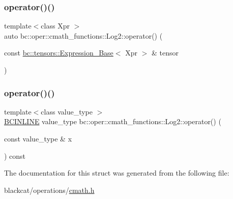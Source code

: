 \mbox{\label{structbc_1_1oper_1_1cmath__functions_1_1Log2_a57496f3baae3c207ec16b69391822119}} 
\subsubsection{\texorpdfstring{operator()()}{operator()()}\hspace{0.1cm}{\footnotesize\ttfamily [2/3]}}
{\footnotesize\ttfamily template$<$class Xpr $>$ \\
auto bc\+::oper\+::cmath\+\_\+functions\+::\+Log2\+::operator() (\begin{DoxyParamCaption}\item[{const \hyperlink{classbc_1_1tensors_1_1Expression__Base}{bc\+::tensors\+::\+Expression\+\_\+\+Base}$<$ Xpr $>$ \&}]{tensor }\end{DoxyParamCaption})\hspace{0.3cm}{\ttfamily [inline]}}

\mbox{\label{structbc_1_1oper_1_1cmath__functions_1_1Log2_a12965107880bfa752dfe41e57f7e29c4}} 
\subsubsection{\texorpdfstring{operator()()}{operator()()}\hspace{0.1cm}{\footnotesize\ttfamily [3/3]}}
{\footnotesize\ttfamily template$<$class value\+\_\+type $>$ \\
\hyperlink{common_8h_a6699e8b0449da5c0fafb878e59c1d4b1}{B\+C\+I\+N\+L\+I\+NE} value\+\_\+type bc\+::oper\+::cmath\+\_\+functions\+::\+Log2\+::operator() (\begin{DoxyParamCaption}\item[{const value\+\_\+type \&}]{x }\end{DoxyParamCaption}) const\hspace{0.3cm}{\ttfamily [inline]}}



The documentation for this struct was generated from the following file\+:\begin{DoxyCompactItemize}
\item 
blackcat/operations/\hyperlink{cmath_8h}{cmath.\+h}\end{DoxyCompactItemize}
